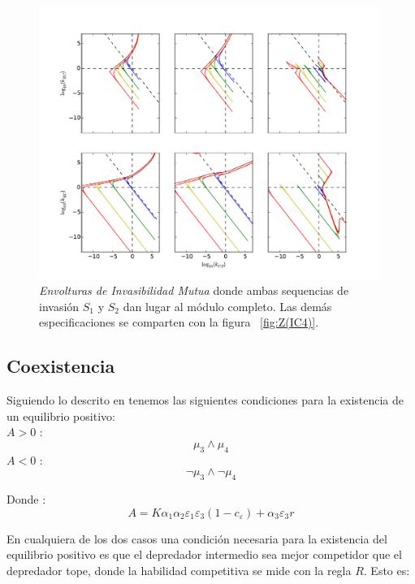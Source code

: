 \begin{figure}
  \centering
  \includegraphics[width = 0.99\textwidth]{./Plots/MutualInvAcGrGr.pdf}
  \caption[Env $I_M$]{\emph{Envolturas de Invasibilidad Mutua} donde ambas sequencias de invasi\'on $S_1$ y $S_2$ dan lugar al m\'odulo completo. Las dem\'as especificaciones se comparten con la figura ~\ref{fig:Z(IC4)}.}
  \label{fig:MutualInv}
\end{figure}


\subsection{Coexistencia}
Siguiendo lo descrito en \cite{holt1997theoretical} tenemos las siguientes condiciones para la existencia de un equilibrio positivo:\\
$A >0$ :
\begin{equation}
  \mu_3 \land \mu_4
\end{equation}
$A <0$ :
\begin{equation}
  \lnot \mu_3 \land \lnot \mu_4
\end{equation}
 
Donde :
\begin{equation}
  A = K \alpha_1 \alpha_2 \varepsilon_1 \varepsilon_3(1-c_\varepsilon) + \alpha_3\varepsilon_3 r
\end{equation}

En cualquiera de los dos casos una condici\'on necesaria para la existencia del equilibrio positivo es que el depredador intermedio sea mejor competidor que el depredador tope, donde la habilidad competitiva se mide con la regla $R$\citep{holt1997theoretical,Tilman1990}. Esto es:

